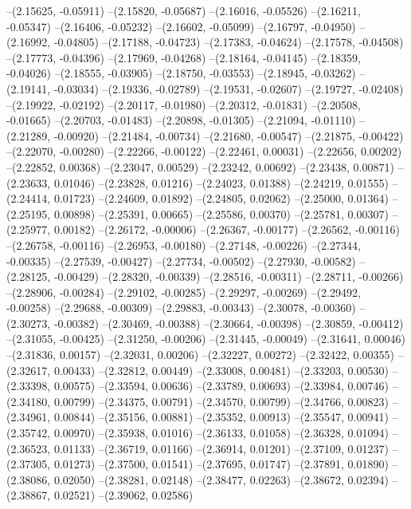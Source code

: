--(2.15625, -0.05911)
--(2.15820, -0.05687)
--(2.16016, -0.05526)
--(2.16211, -0.05347)
--(2.16406, -0.05232)
--(2.16602, -0.05099)
--(2.16797, -0.04950)
--(2.16992, -0.04805)
--(2.17188, -0.04723)
--(2.17383, -0.04624)
--(2.17578, -0.04508)
--(2.17773, -0.04396)
--(2.17969, -0.04268)
--(2.18164, -0.04145)
--(2.18359, -0.04026)
--(2.18555, -0.03905)
--(2.18750, -0.03553)
--(2.18945, -0.03262)
--(2.19141, -0.03034)
--(2.19336, -0.02789)
--(2.19531, -0.02607)
--(2.19727, -0.02408)
--(2.19922, -0.02192)
--(2.20117, -0.01980)
--(2.20312, -0.01831)
--(2.20508, -0.01665)
--(2.20703, -0.01483)
--(2.20898, -0.01305)
--(2.21094, -0.01110)
--(2.21289, -0.00920)
--(2.21484, -0.00734)
--(2.21680, -0.00547)
--(2.21875, -0.00422)
--(2.22070, -0.00280)
--(2.22266, -0.00122)
--(2.22461, 0.00031)
--(2.22656, 0.00202)
--(2.22852, 0.00368)
--(2.23047, 0.00529)
--(2.23242, 0.00692)
--(2.23438, 0.00871)
--(2.23633, 0.01046)
--(2.23828, 0.01216)
--(2.24023, 0.01388)
--(2.24219, 0.01555)
--(2.24414, 0.01723)
--(2.24609, 0.01892)
--(2.24805, 0.02062)
--(2.25000, 0.01364)
--(2.25195, 0.00898)
--(2.25391, 0.00665)
--(2.25586, 0.00370)
--(2.25781, 0.00307)
--(2.25977, 0.00182)
--(2.26172, -0.00006)
--(2.26367, -0.00177)
--(2.26562, -0.00116)
--(2.26758, -0.00116)
--(2.26953, -0.00180)
--(2.27148, -0.00226)
--(2.27344, -0.00335)
--(2.27539, -0.00427)
--(2.27734, -0.00502)
--(2.27930, -0.00582)
--(2.28125, -0.00429)
--(2.28320, -0.00339)
--(2.28516, -0.00311)
--(2.28711, -0.00266)
--(2.28906, -0.00284)
--(2.29102, -0.00285)
--(2.29297, -0.00269)
--(2.29492, -0.00258)
--(2.29688, -0.00309)
--(2.29883, -0.00343)
--(2.30078, -0.00360)
--(2.30273, -0.00382)
--(2.30469, -0.00388)
--(2.30664, -0.00398)
--(2.30859, -0.00412)
--(2.31055, -0.00425)
--(2.31250, -0.00206)
--(2.31445, -0.00049)
--(2.31641, 0.00046)
--(2.31836, 0.00157)
--(2.32031, 0.00206)
--(2.32227, 0.00272)
--(2.32422, 0.00355)
--(2.32617, 0.00433)
--(2.32812, 0.00449)
--(2.33008, 0.00481)
--(2.33203, 0.00530)
--(2.33398, 0.00575)
--(2.33594, 0.00636)
--(2.33789, 0.00693)
--(2.33984, 0.00746)
--(2.34180, 0.00799)
--(2.34375, 0.00791)
--(2.34570, 0.00799)
--(2.34766, 0.00823)
--(2.34961, 0.00844)
--(2.35156, 0.00881)
--(2.35352, 0.00913)
--(2.35547, 0.00941)
--(2.35742, 0.00970)
--(2.35938, 0.01016)
--(2.36133, 0.01058)
--(2.36328, 0.01094)
--(2.36523, 0.01133)
--(2.36719, 0.01166)
--(2.36914, 0.01201)
--(2.37109, 0.01237)
--(2.37305, 0.01273)
--(2.37500, 0.01541)
--(2.37695, 0.01747)
--(2.37891, 0.01890)
--(2.38086, 0.02050)
--(2.38281, 0.02148)
--(2.38477, 0.02263)
--(2.38672, 0.02394)
--(2.38867, 0.02521)
--(2.39062, 0.02586)
